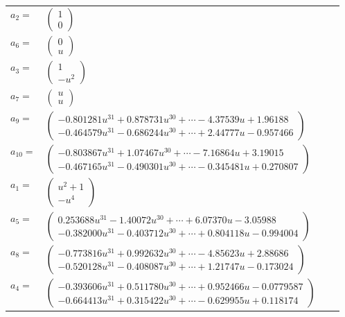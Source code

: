 \documentclass[1p]{elsarticle_modified}
\theoremstyle{definition}
\begin{document}
\begin{tabular}{m{7pt} m{180pt} m{7pt} m{180pt} }
\flushright $a_{2}=$&$\begin{pmatrix}1\\0\end{pmatrix}$ \\
\flushright $a_{6}=$&$\begin{pmatrix}0\\u\end{pmatrix}$ \\
\flushright $a_{3}=$&$\begin{pmatrix}1\\- u^2\end{pmatrix}$ \\
\flushright $a_{7}=$&$\begin{pmatrix}u\\u\end{pmatrix}$ \\
\flushright $a_{9}=$&$\begin{pmatrix}-0.801281 u^{31}+0.878731 u^{30}+\cdots-4.37539 u+1.96188\\-0.464579 u^{31}-0.686244 u^{30}+\cdots+2.44777 u-0.957466\end{pmatrix}$ \\
\flushright $a_{10}=$&$\begin{pmatrix}-0.803867 u^{31}+1.07467 u^{30}+\cdots-7.16864 u+3.19015\\-0.467165 u^{31}-0.490301 u^{30}+\cdots-0.345481 u+0.270807\end{pmatrix}$ \\
\flushright $a_{1}=$&$\begin{pmatrix}u^2+1\\- u^4\end{pmatrix}$ \\
\flushright $a_{5}=$&$\begin{pmatrix}0.253688 u^{31}-1.40072 u^{30}+\cdots+6.07370 u-3.05988\\-0.382000 u^{31}-0.403712 u^{30}+\cdots+0.804118 u-0.994004\end{pmatrix}$ \\
\flushright $a_{8}=$&$\begin{pmatrix}-0.773816 u^{31}+0.992632 u^{30}+\cdots-4.85623 u+2.88686\\-0.520128 u^{31}-0.408087 u^{30}+\cdots+1.21747 u-0.173024\end{pmatrix}$ \\
\flushright $a_{4}=$&$\begin{pmatrix}-0.393606 u^{31}+0.511780 u^{30}+\cdots+0.952466 u-0.0779587\\-0.664413 u^{31}+0.315422 u^{30}+\cdots-0.629955 u+0.118174\end{pmatrix}$ \\

\end{tabular}
\end{document}

